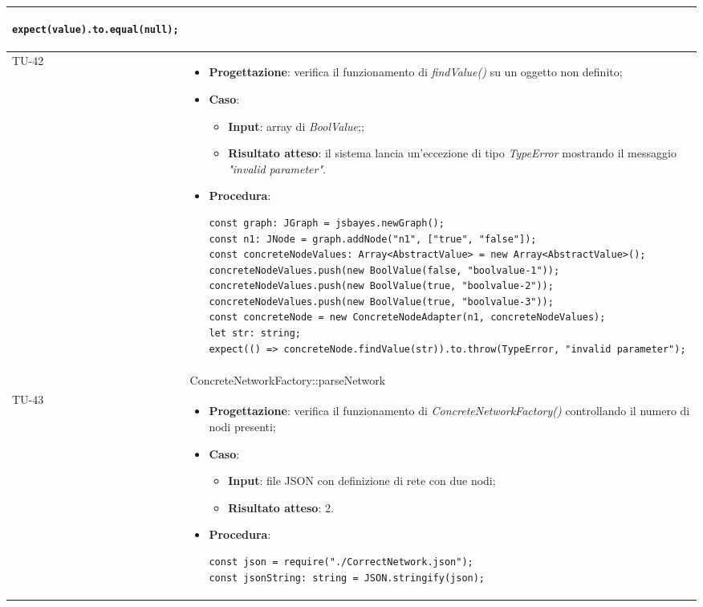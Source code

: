 \begin{longtable}{|C{1.5cm}|C{14.5cm}|}
\begin{itemize}
\begin{lstlisting}
expect(value).to.equal(null);
		\end{lstlisting}
	\end{itemize}\\
	\hline
	{TU-42} &
	\begin{itemize}
		\item \textbf{Progettazione}: verifica il funzionamento di \emph{findValue()} su un oggetto non definito;
		\item \textbf{Caso}: 
		\begin{itemize}
			\item \textbf{Input}: array di \emph{BoolValue};;
			\item \textbf{Risultato atteso}: il sistema lancia un'eccezione di tipo \emph{TypeError} mostrando il messaggio \emph{"invalid parameter"}.
		\end{itemize}
		\item \textbf{Procedura}:
		\begin{lstlisting}
const graph: JGraph = jsbayes.newGraph();
const n1: JNode = graph.addNode("n1", ["true", "false"]);
const concreteNodeValues: Array<AbstractValue> = new Array<AbstractValue>();
concreteNodeValues.push(new BoolValue(false, "boolvalue-1"));
concreteNodeValues.push(new BoolValue(true, "boolvalue-2"));
concreteNodeValues.push(new BoolValue(true, "boolvalue-3"));
const concreteNode = new ConcreteNodeAdapter(n1, concreteNodeValues);
let str: string;
expect(() => concreteNode.findValue(str)).to.throw(TypeError, "invalid parameter");
		\end{lstlisting}
	\end{itemize}\\
	\hline
	 & ConcreteNetworkFactory::parseNetwork \\
	\hline
	{TU-43} &
	\begin{itemize}
		\item \textbf{Progettazione}: verifica il funzionamento di \emph{ConcreteNetworkFactory()} controllando il numero di nodi presenti;
		\item \textbf{Caso}: 
		\begin{itemize}
			\item \textbf{Input}: file JSON con definizione di rete con due nodi;
			\item \textbf{Risultato atteso}: 2.
		\end{itemize}
		\item \textbf{Procedura}:
		\begin{lstlisting}
const json = require("./CorrectNetwork.json");
const jsonString: string = JSON.stringify(json);

\end{lstlisting}
\end{itemize}
\end{longtable}
